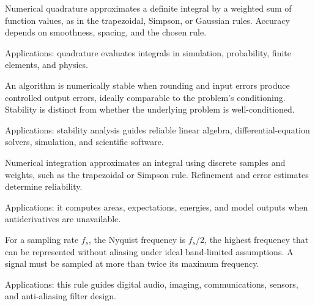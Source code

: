 Numerical quadrature approximates a definite integral by a weighted sum of function values, as in the trapezoidal, Simpson, or Gaussian rules. Accuracy depends on smoothness, spacing, and the chosen rule. \par\noindent Applications: quadrature evaluates integrals in simulation, probability, finite elements, and physics.

An algorithm is numerically stable when rounding and input errors produce controlled output errors, ideally comparable to the problem's conditioning. Stability is distinct from whether the underlying problem is well-conditioned. \par\noindent Applications: stability analysis guides reliable linear algebra, differential-equation solvers, simulation, and scientific software.

Numerical integration approximates an integral using discrete samples and weights, such as the trapezoidal or Simpson rule. Refinement and error estimates determine reliability. \par\noindent Applications: it computes areas, expectations, energies, and model outputs when antiderivatives are unavailable.

For a sampling rate $f_s$, the Nyquist frequency is $f_s/2$, the highest frequency that can be represented without aliasing under ideal band-limited assumptions. A signal must be sampled at more than twice its maximum frequency. \par\noindent Applications: this rule guides digital audio, imaging, communications, sensors, and anti-aliasing filter design.
